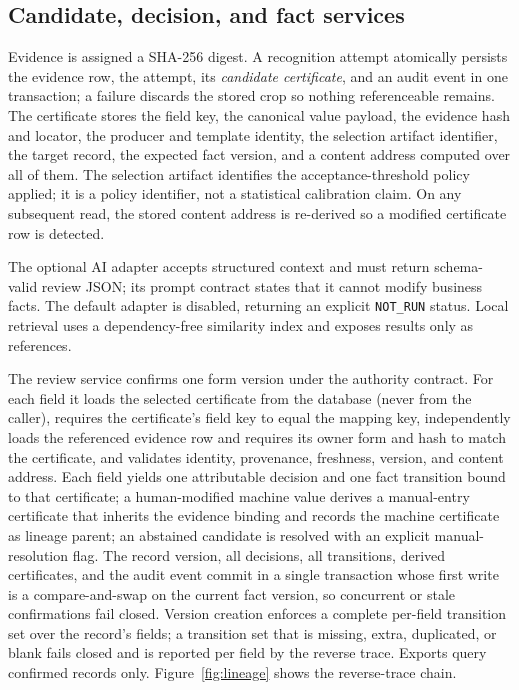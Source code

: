 \subsection{Candidate, decision, and fact services}
Evidence is assigned a SHA-256 digest. A recognition attempt atomically persists the evidence row, the attempt, its \emph{candidate certificate}, and an audit event in one transaction; a failure discards the stored crop so nothing referenceable remains. The certificate stores the field key, the canonical value payload, the evidence hash and locator, the producer and template identity, the selection artifact identifier, the target record, the expected fact version, and a content address computed over all of them. The selection artifact identifies the acceptance-threshold policy applied; it is a policy identifier, not a statistical calibration claim. On any subsequent read, the stored content address is re-derived so a modified certificate row is detected.

The optional AI adapter accepts structured context and must return schema-valid review JSON; its prompt contract states that it cannot modify business facts. The default adapter is disabled, returning an explicit \texttt{NOT\_RUN} status. Local retrieval uses a dependency-free similarity index and exposes results only as references.

The review service confirms one form version under the authority contract. For each field it loads the selected certificate from the database (never from the caller), requires the certificate's field key to equal the mapping key, independently loads the referenced evidence row and requires its owner form and hash to match the certificate, and validates identity, provenance, freshness, version, and content address. Each field yields one attributable decision and one fact transition bound to that certificate; a human-modified machine value derives a manual-entry certificate that inherits the evidence binding and records the machine certificate as lineage parent; an abstained candidate is resolved with an explicit manual-resolution flag. The record version, all decisions, all transitions, derived certificates, and the audit event commit in a single transaction whose first write is a compare-and-swap on the current fact version, so concurrent or stale confirmations fail closed. Version creation enforces a complete per-field transition set over the record's fields; a transition set that is missing, extra, duplicated, or blank fails closed and is reported per field by the reverse trace. Exports query confirmed records only. Figure~\ref{fig:lineage} shows the reverse-trace chain.

